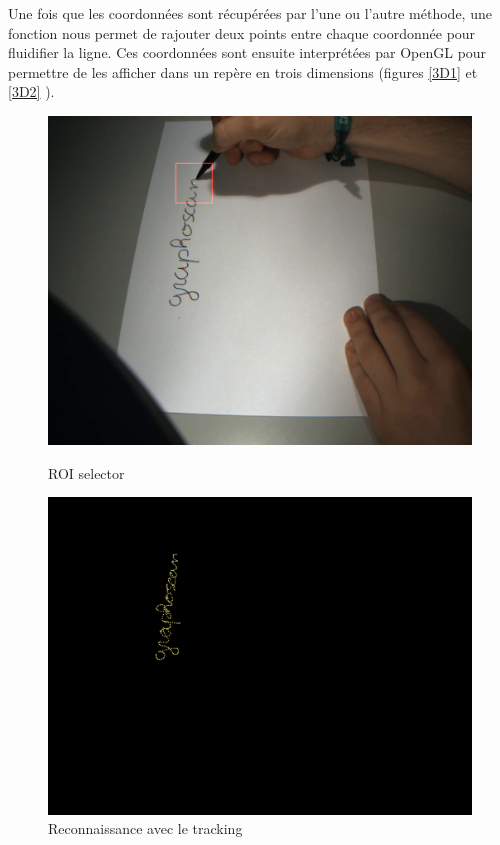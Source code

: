 Une fois que les coordonnées sont récupérées par l'une ou l'autre méthode, une fonction nous permet de rajouter deux points entre chaque coordonnée pour fluidifier la ligne. Ces coordonnées sont ensuite interprétées par OpenGL pour permettre de les afficher dans un repère en trois dimensions (figures \ref{3D1} et \ref{3D2} ).


\begin{figure}[htb]
\includegraphics[width=\textwidth]{Modules/Picture/roi}
\caption{ROI selector}
\label{ROI}
\vspace{30px}
\includegraphics[width=\textwidth]{Modules/Picture/tracking}
\caption{Reconnaissance avec le tracking}
\label{tracking}
\end{figure}

